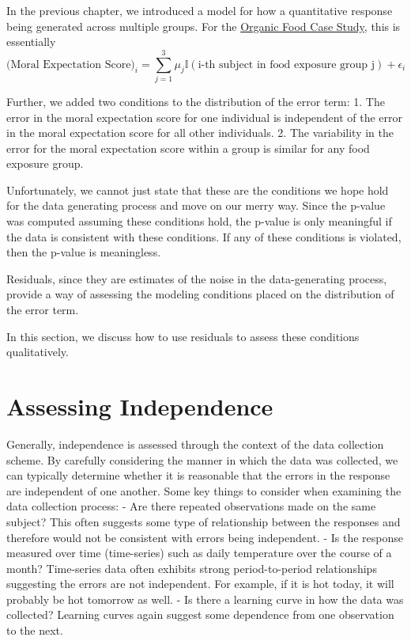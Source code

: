 \documentclass[]{book}
\theoremstyle{definition}
\theoremstyle{definition}
\theoremstyle{remark}
\let\BeginKnitrBlock\begin \let\EndKnitrBlock\end
\begin{document}
In the previous chapter, we introduced a model for how a quantitative
response being generated across multiple groups. For the
\protect\hyperlink{CaseOrganic}{Organic Food Case Study}, this is
essentially \[
\text{(Moral Expectation Score)}_i = \sum_{j=1}^3 \mu_j \mathbb{I}(\text{i-th subject in food exposure group j}) + \epsilon_i
\]

Further, we added two conditions to the distribution of the error term:
1. The error in the moral expectation score for one individual is
independent of the error in the moral expectation score for all other
individuals. 2. The variability in the error for the moral expectation
score within a group is similar for any food exposure group.

Unfortunately, we cannot just state that these are the conditions we
hope hold for the data generating process and move on our merry way.
Since the p-value was computed assuming these conditions hold, the
p-value is only meaningful if the data is consistent with these
conditions. If any of these conditions is violated, then the p-value is
meaningless.

\BeginKnitrBlock{rmdkeyidea}
Residuals, since they are estimates of the noise in the data-generating
process, provide a way of assessing the modeling conditions placed on
the distribution of the error term.
\EndKnitrBlock{rmdkeyidea}

In this section, we discuss how to use residuals to assess these
conditions qualitatively.

\section{Assessing Independence}\label{assessing-independence}

Generally, independence is assessed through the context of the data
collection scheme. By carefully considering the manner in which the data
was collected, we can typically determine whether it is reasonable that
the errors in the response are independent of one another. Some key
things to consider when examining the data collection process: - Are
there repeated observations made on the same subject? This often
suggests some type of relationship between the responses and therefore
would not be consistent with errors being independent. - Is the response
measured over time (time-series) such as daily temperature over the
course of a month? Time-series data often exhibits strong
period-to-period relationships suggesting the errors are not
independent. For example, if it is hot today, it will probably be hot
tomorrow as well. - Is there a learning curve in how the data was
collected? Learning curves again suggest some dependence from one
observation to the next.
\end{document}
